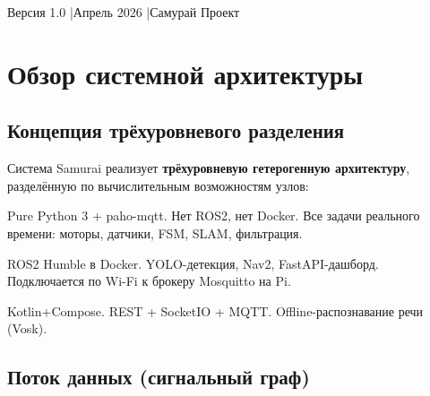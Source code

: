 \documentclass[12pt, a4paper]{article}
\begin{document}
\begin{titlepage}
\begin{center}
\vfill
{\small\color{gray} Версия 1.0 \quad|\quad Апрель 2026 \quad|\quad Самурай Проект}
\end{center}
\end{titlepage}

\newpage
\tableofcontents
\newpage

\section{Обзор системной архитектуры}
\label{sec:overview}

\subsection{Концепция трёхуровневого разделения}

Система Samurai реализует \textbf{трёхуровневую гетерогенную архитектуру}, разделённую по вычислительным возможностям узлов:

\begin{tcolorbox}[enhanced, colback=lightblue, colframe=primary, title=\textbf{Три уровня системы}]
\begin{description}[leftmargin=2cm]
  \item[\color{primary}Pi (робот)] Pure Python 3 + paho-mqtt. Нет ROS2, нет Docker.
    Все задачи реального времени: моторы, датчики, FSM, SLAM, фильтрация.
  \item[\color{secondary}Лэптоп] ROS2 Humble в Docker. YOLO-детекция, Nav2, FastAPI-дашборд.
    Подключается по Wi-Fi к брокеру Mosquitto на Pi.
  \item[\color{warning}Android] Kotlin+Compose. REST + SocketIO + MQTT.
    Offline-распознавание речи (Vosk).
\end{description}
\end{tcolorbox}

\subsection{Поток данных (сигнальный граф)}
\end{document}
